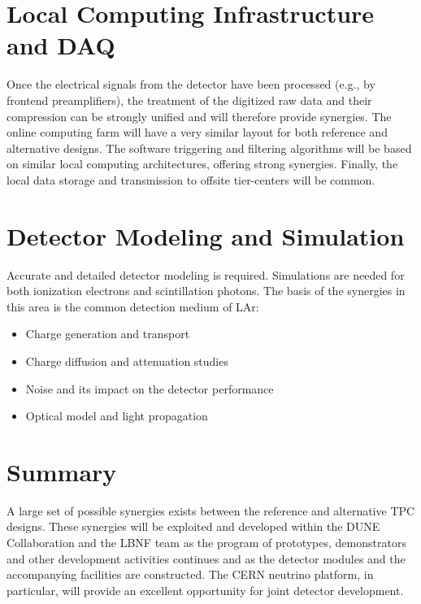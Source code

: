 \section{Local Computing Infrastructure and DAQ}

Once the electrical signals from the detector have been processed
(e.g., by frontend preamplifiers), the treatment of the digitized raw data and
their compression can be strongly unified and will therefore provide
synergies. The online computing farm will have a very similar layout
for both reference and alternative designs. The software triggering and
filtering algorithms will be based on similar local computing
architectures, offering strong synergies. Finally, the local data
storage and transmission to offsite tier-centers will be common.


\section{Detector Modeling and Simulation}

Accurate and detailed detector modeling is required.  Simulations are
needed for both ionization electrons and scintillation photons. The
basis of the synergies in this area is the common detection medium of
LAr:
\begin{itemize}
\item Charge generation and transport
\item Charge diffusion and attenuation studies
\item Noise and its impact on the detector performance
\item Optical model and light propagation
\end{itemize}

\section{Summary}
A large set of possible synergies exists between the reference and
alternative TPC designs. These synergies will be exploited and
developed within the DUNE Collaboration and the LBNF team as the
program of prototypes, demonstrators and other development activities
continues and as the detector modules and the accompanying facilities
are constructed. The CERN neutrino platform, in particular, will
provide an excellent opportunity for joint detector development.

